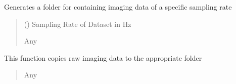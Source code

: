 \documentclass[letterpaper,10pt,english]{sphinxmanual}
\begin{document}
\begin{fulllineitems}
\begin{description}
\end{description}

\begin{fulllineitems}
\label{\detokenize{Organization:Organization.Experiment.ExperimentName_id}}
\pysigstartsignatures
{}
\pysigstopsignatures
\end{fulllineitems}


\begin{fulllineitems}
\label{\detokenize{Organization:Organization.Experiment.add_image_sampling_folder}}
\pysigstartsignatures
{}
\pysigstopsignatures
\sphinxAtStartPar
Generates a folder for containing imaging data of a specific sampling rate
\begin{quote}\begin{description}
\sphinxAtStartPar
{} () \textendash{} Sampling Rate of Dataset in Hz

\sphinxAtStartPar
Any

\end{description}\end{quote}

\end{fulllineitems}


\begin{fulllineitems}
\label{\detokenize{Organization:Organization.Experiment.copy_raw_imaging_data}}
\pysigstartsignatures
{}
\pysigstopsignatures
\sphinxAtStartPar
This function copies raw imaging data to the appropriate folder
\begin{quote}\begin{description}
\sphinxAtStartPar
Any


\end{description}
\end{quote}
\end{fulllineitems}
\end{fulllineitems}
\end{document}
